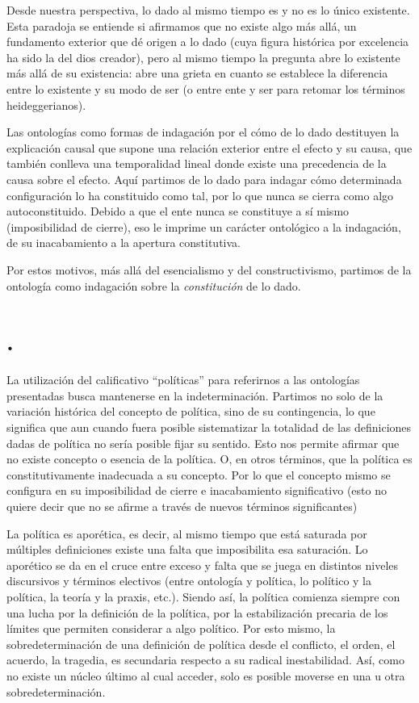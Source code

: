 Desde nuestra perspectiva, lo dado al mismo tiempo es y no es lo único existente. Esta paradoja se entiende si afirmamos que no existe algo más allá, un fundamento exterior que dé origen a lo dado (cuya figura histórica por excelencia ha sido la del dios creador), pero al mismo tiempo la pregunta abre lo existente más allá de su existencia: abre una grieta en cuanto se establece la diferencia entre lo existente y su modo de ser (o entre ente y ser para retomar los términos heideggerianos).

Las ontologías como formas de indagación por el cómo de lo dado destituyen la explicación causal que supone una relación exterior entre el efecto y su causa, que también conlleva una temporalidad lineal donde existe una precedencia de la causa sobre el efecto. Aquí partimos de lo dado para indagar \linebreak cómo determinada configuración lo ha constituido como tal, por lo que   nunca se cierra como algo autoconstituido. Debido a que el ente nunca se constituye a sí mismo (imposibilidad de cierre), eso le imprime un carácter ontológico a la indagación, de su inacabamiento a la apertura constitutiva.

Por estos motivos, más allá del esencialismo y del constructivismo, partimos de la ontología como indagación sobre la \emph{constitución} de lo dado.

\section*{.}

La utilización del calificativo \enquote{políticas} para referirnos a las ontologías presentadas busca mantenerse en la indeterminación. Partimos no solo de la variación histórica del concepto de política, sino de su contingencia, lo que significa que aun cuando fuera posible sistematizar la totalidad de las definiciones dadas de política no sería posible fijar su sentido. Esto nos permite afirmar que no existe concepto o esencia de la política. O, en otros términos, que la política es constitutivamente inadecuada a su concepto. Por lo que el concepto mismo se configura en su imposibilidad de cierre e inacabamiento significativo (esto no quiere decir que no se afirme a través de nuevos términos significantes)

La política es aporética, es decir, al mismo tiempo que está saturada por múltiples definiciones existe una falta que imposibilita esa saturación. Lo aporético se da en el cruce entre exceso y falta que se juega en distintos niveles discursivos y términos electivos (entre ontología y política, lo político y la política, la teoría y la praxis, etc.). Siendo así, la política comienza siempre con una lucha por la definición de la política, por la estabilización precaria de los límites que permiten considerar a algo político. Por esto mismo, la sobredeterminación de una definición de política desde el conflicto, el orden, el acuerdo, la tragedia, es secundaria respecto a su radical inestabilidad. Así, como no existe un núcleo último al cual acceder, solo es posible moverse en una u otra sobredeterminación.

